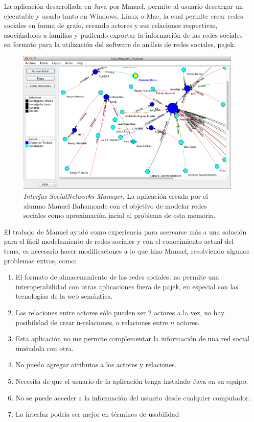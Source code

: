 La aplicación desarrollada en Java por Manuel, permite al usuario descargar un ejecutable y usarlo tanto en Windows, Linux o Mac, la cual permite crear redes sociales en forma de grafo, creando actores y sus relaciones respectivas, asociándolos a familias y pudiendo exportar la información de las redes sociales en formato para la utilización del software de análsis de redes sociales, pajek\cite{pajek}.

\begin{figure}[H]
  \includegraphics[width=1.0\textwidth]{images/memoria_manuel.png}
  \caption[Interfaz SocialNetworks Manager]{\emph{Interfaz SocialNetworks Manager}. La aplicación creada por el alumno Manuel Bahamonde con el objetivo de modelar redes sociales como aproximación incial al problema de esta memoria.}
  \label{memoria_manuel}
\end{figure}

El trabajo de Manuel ayudó como experiencia para acercarse más a una solución para el fácil modelamiento de redes sociales y con el conocimiento actual del tema, es necesario hacer modificaciones a lo que hizo Manuel, resolviendo algunos problemas extras, como:

  \begin{enumerate}
    \item El formato de almacenamiento de las redes sociales, no permite una interoperabilidad con otras aplicaciones fuera de pajek\cite{pajek}, en especial con las tecnologías de la web semántica.
    \item Las relaciones entre actores sólo pueden ser 2 actores a la vez, no hay posibilidad de crear n-relaciones, o relaciones entre $n$ actores.
    \item Esta aplicación no me permite complementar la información de una red social uniéndola con otra.
    \item No puedo agregar atributos a los actores y relaciones.
    \item Necesita de que el usuario de la aplicación tenga instalado Java en su equipo.
    \item No se puede acceder a la información del usuario desde cualquier computador.
    \item La interfaz podría ser mejor en términos de usabilidad
  \end{enumerate}

